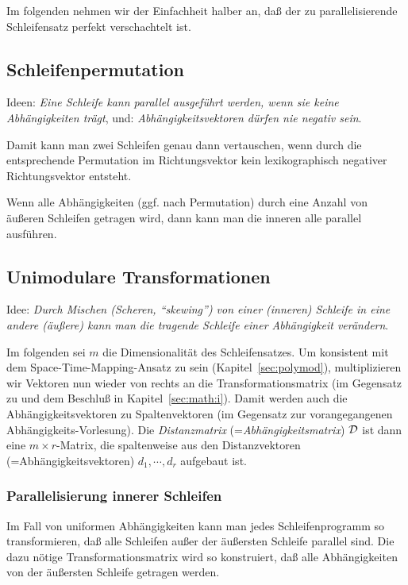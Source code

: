 \bigskip

Im folgenden nehmen wir der Einfachheit halber an, daß der zu
parallelisierende Schleifensatz perfekt verschachtelt ist.

\subsection{Schleifenpermutation}

Ideen: \textit{Eine Schleife kann parallel ausgeführt werden, wenn sie keine
Abhängigkeiten trägt}, und: \textit{Abhängigkeitsvektoren dürfen nie
negativ sein}.

Damit kann man zwei Schleifen genau dann vertauschen, wenn durch die
entsprechende Permutation im Richtungsvektor kein lexikographisch
negativer Richtungsvektor entsteht. 

Wenn alle Abhängigkeiten (ggf. nach Permutation) durch eine Anzahl von
äußeren Schleifen getragen wird, dann kann man die inneren alle parallel
ausführen.

\subsection{Unimodulare Transformationen}

Idee: \textit{Durch Mischen (Scheren, ``skewing'') von einer (inneren)
Schleife in
eine andere (äußere) kann man die tragende Schleife einer Abhängigkeit
verändern}.

Im folgenden sei $m$ die Dimensionalität des Schleifensatzes. Um
konsistent mit dem Space-Time-Mapping-Ansatz zu sein
(Kapitel~\ref{sec:polymod}), multiplizieren wir Vektoren nun wieder von
rechts an die Transformationsmatrix (im Gegensatz zu \cite{Ban93, Ban94}
und dem Beschluß in Kapitel~\ref{sec:math:i}). Damit werden auch die
Abhängigkeitsvektoren zu Spaltenvektoren (im Gegensatz zur
vorangegangenen Abhängigkeits-Vorlesung).  Die \emph{Distanzmatrix}
(=\emph{Abhängigkeitsmatrix}) $\cal D$ ist dann eine
$m\!\times\!r$-Matrix, die spaltenweise aus den Distanzvektoren
(=Abhängigkeitsvektoren) $d_1,\cdots,d_r$ aufgebaut ist.

\subsubsection{Parallelisierung innerer Schleifen}

Im Fall von uniformen Abhängigkeiten kann man jedes Schleifenprogramm so
transformieren, daß alle Schleifen außer der äußersten Schleife parallel
sind. Die dazu nötige Transformationsmatrix wird so konstruiert, daß
alle Abhängigkeiten von der äußersten Schleife getragen werden.

